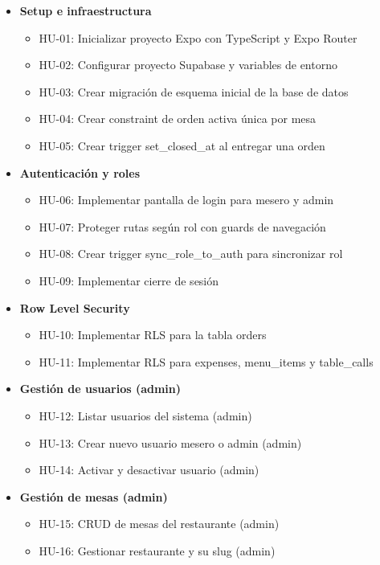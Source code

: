 \begin{itemize}[leftmargin=1.5em]

\item \textbf{Setup e infraestructura}

\begin{itemize}
\item HU-01: Inicializar proyecto Expo con TypeScript y Expo Router
\item HU-02: Configurar proyecto Supabase y variables de entorno
\item HU-03: Crear migración de esquema inicial de la base de datos
\item HU-04: Crear constraint de orden activa única por mesa
\item HU-05: Crear trigger set\_closed\_at al entregar una orden
\end{itemize}

\item \textbf{Autenticación y roles}

\begin{itemize}
\item HU-06: Implementar pantalla de login para mesero y admin
\item HU-07: Proteger rutas según rol con guards de navegación
\item HU-08: Crear trigger sync\_role\_to\_auth para sincronizar rol
\item HU-09: Implementar cierre de sesión
\end{itemize}

\item \textbf{Row Level Security}

\begin{itemize}
\item HU-10: Implementar RLS para la tabla orders
\item HU-11: Implementar RLS para expenses, menu\_items y table\_calls
\end{itemize}

\item \textbf{Gestión de usuarios (admin)}

\begin{itemize}
\item HU-12: Listar usuarios del sistema (admin)
\item HU-13: Crear nuevo usuario mesero o admin (admin)
\item HU-14: Activar y desactivar usuario (admin)
\end{itemize}

\item \textbf{Gestión de mesas (admin)}

\begin{itemize}
\item HU-15: CRUD de mesas del restaurante (admin)
\item HU-16: Gestionar restaurante y su slug (admin)
\end{itemize}

\end{itemize}


